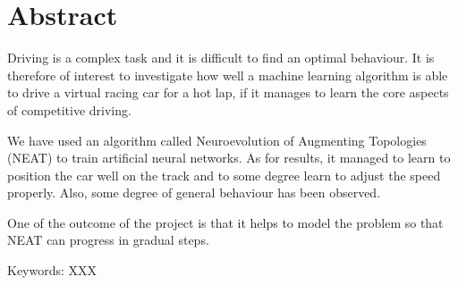 \thispagestyle{plain}			%
\setlength{\parskip}{0pt plus 1.0pt}
\section*{Abstract}
Driving is a complex task and it is difficult to find an optimal behaviour. It is therefore of interest to investigate how well a machine learning algorithm is able to drive a virtual racing car for a hot lap, if it manages to learn the core aspects of competitive driving.

We have used an algorithm called Neuroevolution of Augmenting Topologies (NEAT) to train artificial neural networks. As for results, it managed to learn to position the car well on the track and to some degree learn to adjust the speed properly. Also, some degree of general behaviour has been observed.

One of the outcome of the project is that it helps to model the problem so that NEAT can progress in gradual steps.

\vfill
Keywords: XXX

\newpage				%
\thispagestyle{empty}
\mbox{}


